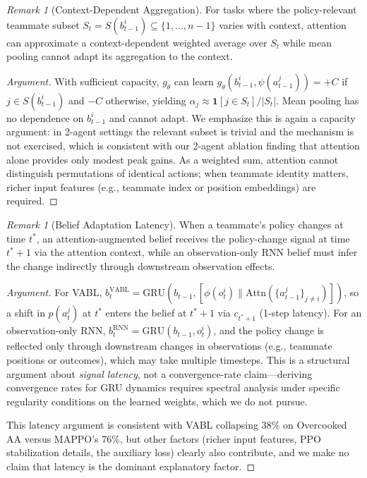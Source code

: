\documentclass{article}
\theoremstyle{plain}
\theoremstyle{definition}
\theoremstyle{remark}
\newtheorem{remark}[theorem]{Remark}
\begin{document}
\begin{remark}[Context-Dependent Aggregation]
\label{rem:context_dep}
For tasks where the policy-relevant teammate subset $S_t = S(b_{t-1}^i) \subseteq \{1, \ldots, n-1\}$ varies with context, attention can approximate a context-dependent weighted average over $S_t$ while mean pooling cannot adapt its aggregation to the context.
\end{remark}

\begin{proof}[Argument]
With sufficient capacity, $g_\theta$ can learn $g_\theta(b_{t-1}^i, \psi(a_{t-1}^j)) = +C$ if $j \in S(b_{t-1}^i)$ and $-C$ otherwise, yielding $\alpha_j \approx \mathbf{1}[j \in S_t] / |S_t|$. Mean pooling has no dependence on $b_{t-1}^i$ and cannot adapt. We emphasize this is again a capacity argument: in 2-agent settings the relevant subset is trivial and the mechanism is not exercised, which is consistent with our 2-agent ablation finding that attention alone provides only modest peak gains. As a weighted sum, attention cannot distinguish permutations of identical actions; when teammate identity matters, richer input features (e.g., teammate index or position embeddings) are required.
\end{proof}

\begin{remark}[Belief Adaptation Latency]
\label{rem:nonstationarity}
When a teammate's policy changes at time $t^*$, an attention-augmented belief receives the policy-change signal at time $t^*{+}1$ via the attention context, while an observation-only RNN belief must infer the change indirectly through downstream observation effects.
\end{remark}

\begin{proof}[Argument]
For VABL, $b_t^{\mathrm{VABL}} = \mathrm{GRU}(b_{t-1}, [\phi(o_t^i) \| \mathrm{Attn}(\{a_{t-1}^j\}_{j \neq i})])$, so a shift in $p(a_t^j)$ at $t^*$ enters the belief at $t^*{+}1$ via $c_{t^*+1}$ (1-step latency). For an observation-only RNN, $b_t^{\mathrm{RNN}} = \mathrm{GRU}(b_{t-1}, o_t^i)$, and the policy change is reflected only through downstream changes in observations (e.g., teammate positions or outcomes), which may take multiple timesteps. This is a structural argument about \emph{signal latency}, not a convergence-rate claim---deriving convergence rates for GRU dynamics requires spectral analysis under specific regularity conditions on the learned weights, which we do not pursue.

This latency argument is consistent with VABL collapsing 38\% on Overcooked AA versus MAPPO's 76\%, but other factors (richer input features, PPO stabilization details, the auxiliary loss) clearly also contribute, and we make no claim that latency is the dominant explanatory factor.
\end{proof}
\end{document}
